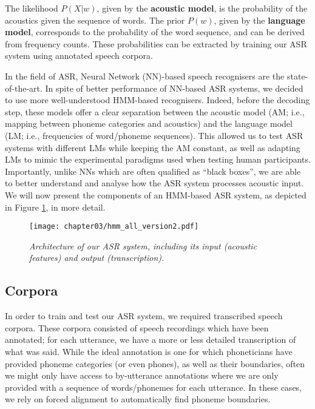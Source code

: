 The likelihood $P(X|w)$, given by the \textbf{acoustic model}, is the probability of the acoustics given the sequence of words. The prior $P(w)$, given by the \textbf{language model}, corresponds to the probability of the word sequence, and can be derived from frequency counts. These probabilities can be extracted by training our ASR system using annotated speech corpora.

In the field of ASR, Neural Network (NN)-based speech recognisers are the state-of-the-art. In spite of better performance of NN-based ASR systems, we decided to use more well-understood HMM-based recognisers. Indeed, before the decoding step, these models offer a clear separation between the acoustic model (AM; i.e., mapping between phoneme categories and acoustics) and the language model (LM; i.e., frequencies of word/phoneme sequences). This allowed us to test ASR systems with different LMs while keeping the AM constant, as well as adapting LMs to mimic the experimental paradigms used when testing human participants. Importantly, unlike NNs which are often qualified as ``black boxes'', we are able to better understand and analyse how the ASR system processes acoustic input. 
We will now present the components of an HMM-based ASR system, as depicted in Figure \ref{fig:hmm_architecture}, in more detail.

\begin{figure}[htb]
\centering
\texttt{[image: chapter03/hmm\_all\_version2.pdf]}
\caption{\textit{Architecture of our ASR system, including its input (acoustic features) and output (transcription).}}
\label{fig:hmm_architecture}
\end{figure}

\subsection{Corpora}

In order to train and test our ASR system, we required transcribed speech corpora. These corpora consisted of speech recordings which have been annotated; for each utterance, we have a more or less detailed transcription of what was said.
While the ideal annotation is one for which phoneticians have provided phoneme categories (or even phones), as well as their boundaries, often we might only have access to by-utterance annotations where we are only provided with a sequence of words/phonemes for each utterance. In these cases, we rely on forced alignment to automatically find phoneme boundaries.

